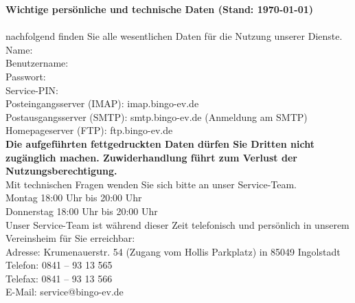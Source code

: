\newpage
\textbf{	Wichtige persönliche und technische Daten
	(Stand: \today)\\}
	\\
	
	
	nachfolgend finden Sie alle wesentlichen Daten für die Nutzung unserer Dienste.\\
	
	Name:			    \Benutzer \\
	Benutzername:		\Login \\
	Passwort:			\textbf{\Password} \\
	Service-PIN:		\textbf{\ServicePin} \\
	
	Posteingangsserver (IMAP):	imap.bingo-ev.de \\
	Postausgangsserver (SMTP):	smtp.bingo-ev.de (Anmeldung am SMTP) \\
	
	Homepageserver (FTP):	ftp.bingo-ev.de\\
	
	
	
	\textbf{Die aufgeführten fettgedruckten Daten dürfen Sie Dritten nicht zugänglich machen.
	Zuwiderhandlung führt zum Verlust der Nutzungsberechtigung.}\\
	
	
	Mit technischen Fragen wenden Sie sich bitte an unser Service-Team.\\
	
	Montag		18:00 Uhr bis 20:00 Uhr\\
	Donnerstag	18:00 Uhr bis 20:00 Uhr\\
	
	
	Unser Service-Team ist während dieser Zeit telefonisch und persönlich in unserem Vereinsheim für Sie erreichbar:\\
	
	Adresse:	Krumenauerstr. 54 (Zugang vom Hollis Parkplatz) in 85049 Ingolstadt\\
	Telefon: 0841 – 93 13 565\\
	Telefax: 0841 – 93 13 566\\
	E-Mail: service@bingo-ev.de\\